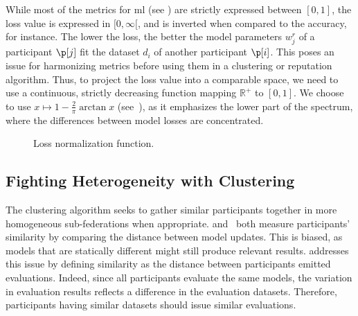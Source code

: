 While most of the metrics for \gls{ml} (see ) are strictly expressed between $[0,1]$, the loss value is expressed in $[0,\infty[$, and is inverted when compared to the accuracy, for instance.
The lower the loss, the better the model parameters $w_j^r$ of a participant $\p[j]$ fit the dataset $d_i$ of another participant $\p[i]$.
This poses an issue for harmonizing metrics before using them in a clustering or reputation algorithm.
Thus, to project the loss value into a comparable space, we need to use a continuous, strictly decreasing function mapping $\mathbb{R}^{+}$ to $[0,1]$.  
We choose to use $x \mapsto 1-\frac{2}{\pi}\arctan x $ (see~), as it emphasizes the lower part of the spectrum, where the differences between model losses are concentrated.

\begin{figure}
  \centering

  \caption{
    Loss normalization function.
    \label{fig:arctan}
  }
\end{figure}


\subsection{Fighting Heterogeneity with Clustering\label{sec:radar.archi.cluster}}

The clustering algorithm seeks to gather similar participants together in more homogeneous sub-federations when appropriate. 
\textcite{nguyen_FLAMETamingBackdoors_2022} and~\textcite{ye_PFedSAPersonalizedFederated_2023} both measure participants' similarity by comparing the distance between model updates. 
This is biased, as models that are statically different might still produce relevant results. 
\thecontrib addresses this issue by defining similarity as the distance between participants emitted evaluations. 
Indeed, since all participants evaluate the same models, the variation in evaluation results reflects a difference in the evaluation datasets. 
Therefore, participants having similar datasets should issue similar evaluations. 

